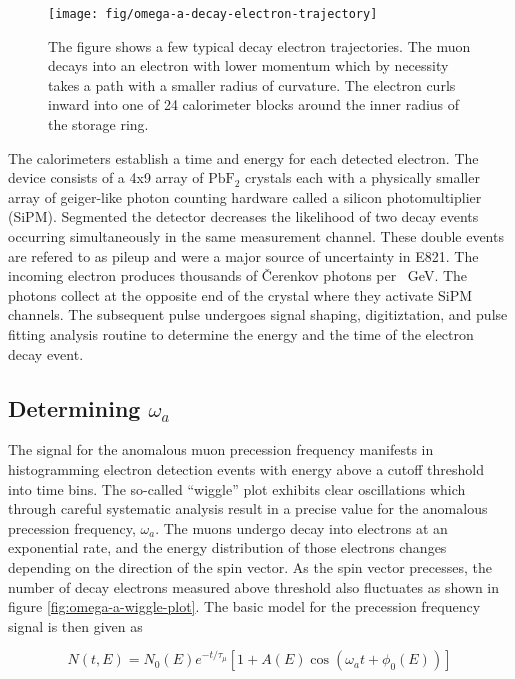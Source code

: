 \begin{figure}
\texttt{[image: fig/omega-a-decay-electron-trajectory]}
\caption{The figure shows a few typical decay electron trajectories.  The muon decays into an electron with lower momentum which by necessity takes a path with a smaller radius of curvature.  The electron curls inward into one of 24 calorimeter blocks around the inner radius of the storage ring. \label{fig:omega-a-decay-electron-trajectory}}
\end{figure}

The calorimeters establish a time and energy for each detected electron.  The device consists of a 4x9 array of $\mathrm{PbF_2}$ crystals each with a physically smaller array of geiger-like photon counting hardware called a silicon photomultiplier (SiPM).  Segmented the detector decreases the likelihood of two decay events occurring simultaneously in the same measurement channel.  These double events are refered to as pileup and were a major source of uncertainty in E821.  The incoming electron produces thousands of \v{C}erenkov photons per \SI{}{\GeV}.  The photons collect at the opposite end of the crystal where they activate SiPM channels.  The subsequent pulse undergoes signal shaping, digitiztation, and pulse fitting analysis routine to determine the energy and the time of the electron decay event.  

\subsection{Determining $\omega_a$}

The signal for the anomalous muon precession frequency manifests in histogramming electron detection events with energy above a cutoff threshold into time bins. The so-called ``wiggle'' plot exhibits clear oscillations which through careful systematic analysis result in a precise value for the anomalous precession frequency, $\omega_a$.  The muons undergo decay into electrons at an exponential rate, and the energy distribution of those electrons changes depending on the direction of the spin vector.  As the spin vector precesses, the number of decay electrons measured above threshold also fluctuates as shown in figure \ref{fig:omega-a-wiggle-plot}.  The basic model for the precession frequency signal is then given as 

\begin{equation}
\label{eqn:omega-a-signal}
N(t, E) = N_0(E) e^{-t/\tau_\mu} \left[ 1 + A(E) \cos(\omega_a t + \phi_0(E))\right]
\end{equation}

